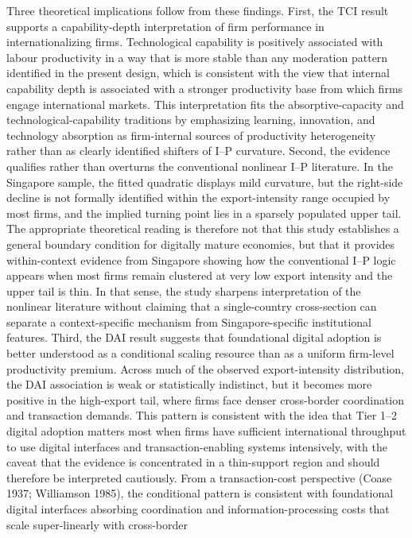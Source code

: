 \documentclass[
  12pt,a4paper]{article}
\begin{document}
Three theoretical implications follow from these findings. First, the
TCI result supports a capability-depth interpretation of firm
performance in internationalizing firms. Technological capability is
positively associated with labour productivity in a way that is more
stable than any moderation pattern identified in the present design,
which is consistent with the view that internal capability depth is
associated with a stronger productivity base from which firms engage
international markets. This interpretation fits the absorptive-capacity
and technological-capability traditions by emphasizing learning,
innovation, and technology absorption as firm-internal sources of
productivity heterogeneity rather than as clearly identified shifters of
I--P curvature. Second, the evidence qualifies rather than overturns the
conventional nonlinear I--P literature. In the Singapore sample, the
fitted quadratic displays mild curvature, but the right-side decline is
not formally identified within the export-intensity range occupied by
most firms, and the implied turning point lies in a sparsely populated
upper tail. The appropriate theoretical reading is therefore not that
this study establishes a general boundary condition for digitally mature
economies, but that it provides within-context evidence from Singapore
showing how the conventional I--P logic appears when most firms remain
clustered at very low export intensity and the upper tail is thin. In
that sense, the study sharpens interpretation of the nonlinear
literature without claiming that a single-country cross-section can
separate a context-specific mechanism from Singapore-specific
institutional features. Third, the DAI result suggests that foundational
digital adoption is better understood as a conditional scaling resource
than as a uniform firm-level productivity premium. Across much of the
observed export-intensity distribution, the DAI association is weak or
statistically indistinct, but it becomes more positive in the
high-export tail, where firms face denser cross-border coordination and
transaction demands. This pattern is consistent with the idea that Tier
1--2 digital adoption matters most when firms have sufficient
international throughput to use digital interfaces and
transaction-enabling systems intensively, with the caveat that the
evidence is concentrated in a thin-support region and should therefore
be interpreted cautiously. From a transaction-cost perspective (Coase
1937; Williamson 1985), the conditional pattern is consistent with
foundational digital interfaces absorbing coordination and
information-processing costs that scale super-linearly with cross-border
\end{document}
